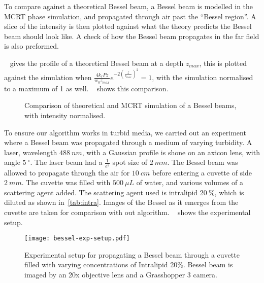 To compare against a theoretical Bessel beam, a Bessel beam is modelled in the MCRT phase simulation, and propagated through air past the ``Bessel region''. 
A slice of the intensity is then plotted against what the theory predicts the Bessel beam should look like. 
A check of how the Bessel beam propagates in the far field is also preformed.


~ gives the profile of a theoretical Bessel beam at a depth $z_{max}$, this is plotted against the simulation when $\tfrac{4k_rPz}{w_0z_{max}}e^{-2\left(\tfrac{z}{z_{max}}\right)^2}=1$, with the simulation normalised to a maximum of 1 as well. ~ shows this comparison.


\begin{figure}[!ht]
    \centering
    \caption{Comparison of theoretical and MCRT simulation of a Bessel beams, with intensity normalised.}
    \label{fig:besselCompare}
\end{figure}

To ensure our algorithm works in turbid media, we carried out an experiment where a Bessel beam was propagated through a medium of varying turbidity.
A laser, wavelength $488~nm$, with a Gaussian profile is shone on an axicon lens, with angle $5~^{\circ}$.
The laser beam had a $\tfrac{1}{e^2}$ spot size of $2~mm$. 
The Bessel beam was allowed to propagate through the air for $10~cm$ before entering a cuvette of side $2~mm$.
The cuvette was filled with $500~\mu L$ of water, and various volumes of a scattering agent added.
The scattering agent used is intralipid $20~\%$, which is diluted as shown in~\cref{tab:intra}.
Images of the Bessel as it emerges from the cuvette are taken for comparison with out algorithm.
~ shows the experimental setup.

\begin{figure}[ht!]
    \centering
    \texttt{[image: bessel-exp-setup.pdf]}
    \caption{Experimental setup for propagating a Bessel beam through a cuvette filled with varying concentrations of Intralipid 20\%. Bessel beam is imaged by an 20x objective lens and a Grasshopper 3 camera.}
    \label{fig:expsetup}
\end{figure}

